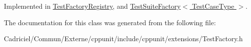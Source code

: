 Implemented in \hyperlink{class_test_factory_registry_a75fd01e6d565fb0f576ed1a887655089}{Test\-Factory\-Registry}, and \hyperlink{class_test_suite_factory_a0790b11de1543fa894acd7069fd1f327}{Test\-Suite\-Factory$<$ Test\-Case\-Type $>$}.



The documentation for this class was generated from the following file\-:\begin{DoxyCompactItemize}
\item 
Cadriciel/\-Commun/\-Externe/cppunit/include/cppunit/extensions/Test\-Factory.\-h\end{DoxyCompactItemize}
